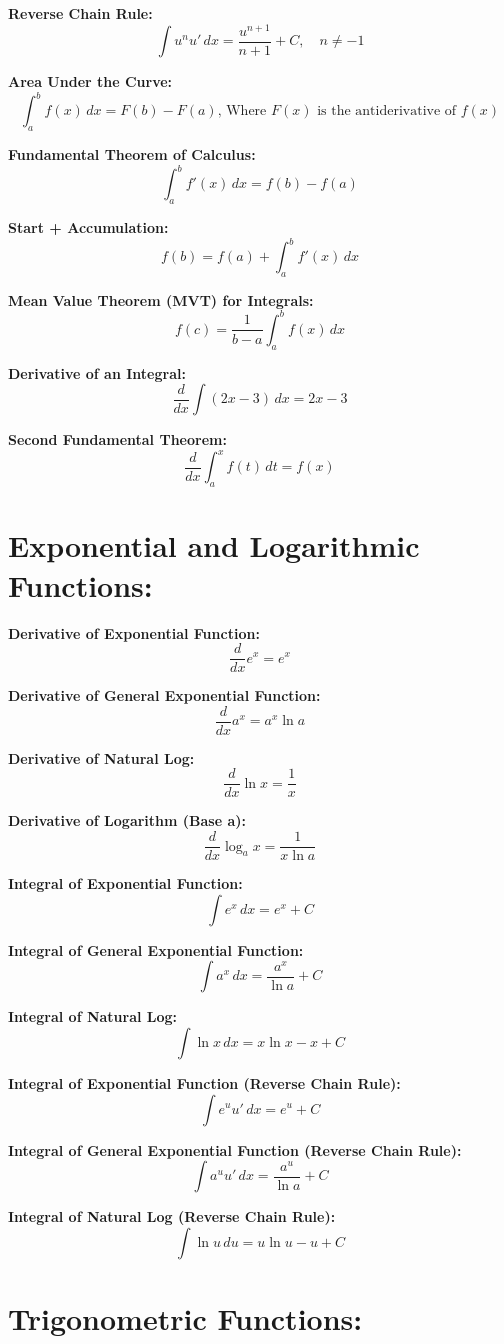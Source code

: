 \documentclass{article}
\begin{document}
\textbf{Reverse Chain Rule:}
\[
\int u^n u' \, dx = \frac{u^{n+1}}{n+1} + C, \quad n \neq -1
\]

\textbf{Area Under the Curve:}
\[
\int_{a}^{b} f(x) \, dx = F(b) - F(a) \text{, Where } F(x) \text{ is the antiderivative of } f(x)
\]

\textbf{Fundamental Theorem of Calculus:}
\[
\int_{a}^{b} f'(x) \, dx = f(b) - f(a)
\]

\textbf{Start + Accumulation:}
\[
f(b) = f(a) + \int_{a}^{b} f'(x) \, dx
\]

\textbf{Mean Value Theorem (MVT) for Integrals:}
\[
f(c) = \frac{1}{b - a} \int_{a}^{b} f(x) \, dx
\]

\textbf{Derivative of an Integral:}
\[
\frac{d}{dx} \int (2x-3)\, dx = 2x-3
\]

\textbf{Second Fundamental Theorem:}
\[
\frac{d}{dx} \int_{a}^{x} f(t) \, dt = f(x)
\]

\section*{\textbf{Exponential and Logarithmic Functions:}}

\textbf{Derivative of Exponential Function:}
\[
\frac{d}{dx} e^x = e^x
\]

\textbf{Derivative of General Exponential Function:}
\[
\frac{d}{dx} a^x = a^x \ln a
\]

\textbf{Derivative of Natural Log:}
\[
\frac{d}{dx} \ln x = \frac{1}{x}
\]

\textbf{Derivative of Logarithm (Base a):}
\[
\frac{d}{dx} \log_a x = \frac{1}{x \ln a}
\]

\textbf{Integral of Exponential Function:}
\[
\int e^x \, dx = e^x + C
\]

\textbf{Integral of General Exponential Function:}
\[
\int a^x \, dx = \frac{a^x}{\ln a} + C
\]

\textbf{Integral of Natural Log:}
\[
\int \ln x \, dx = x \ln x - x + C
\]

\textbf{Integral of Exponential Function (Reverse Chain Rule):}
\[
\int e^{u} u' \, dx = e^{u} + C
\]

\textbf{Integral of General Exponential Function (Reverse Chain Rule):}
\[
\int a^{u} u' \, dx = \frac{a^{u}}{\ln a} + C
\]

\textbf{Integral of Natural Log (Reverse Chain Rule):}
\[
\int \ln u \, du = u \ln u - u + C
\]

\section*{\textbf{Trigonometric Functions:}}
\end{document}
